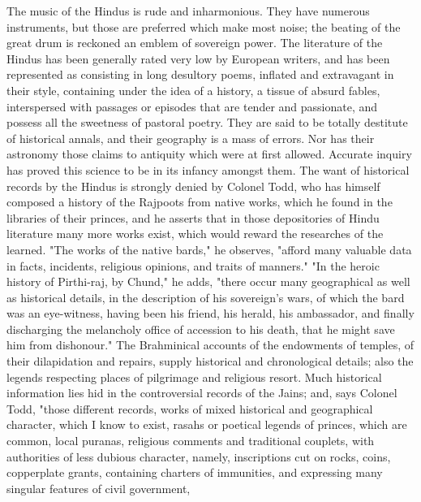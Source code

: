 \documentclass{article}
\begin{document}
The music of the Hindus is rude and inharmonious. They have numerous instruments, but those are preferred which make most noise; the beating of the great drum is reckoned an emblem of sovereign power. The literature of the Hindus has been generally rated very low by European writers, and has been represented as consisting in long desultory poems, inflated and extravagant in their style, containing under the idea of a history, a tissue of absurd fables, interspersed with passages or episodes that are tender and passionate, and possess all the sweetness of pastoral poetry. They are said to be totally destitute of historical annals, and their geography is a mass of errors. Nor has their astronomy those claims to antiquity which were at first allowed. Accurate inquiry has proved this science to be in its infancy amongst them. The want of historical records by the Hindus is strongly denied by Colonel Todd, who has himself composed a history of the Rajpoots from native works, which he found in the libraries of their princes, and he asserts that in those depositories of Hindu literature many more works exist, which would reward the researches of the learned. "The works of the native bards," he observes, "afford many valuable data in facts, incidents, religious opinions, and traits of manners." "In the heroic history of Pirthi-raj, by Chund," he adds, "there occur many geographical as well as historical details, in the description of his sovereign's wars, of which the bard was an eye-witness, having been his friend, his herald, his ambassador, and finally discharging the melancholy office of accession to his death, that he might save him from dishonour." The Brahminical accounts of the endowments of temples, of their dilapidation and repairs, supply historical and chronological details; also the legends respecting places of pilgrimage and religious resort. Much historical information lies hid in the controversial records of the Jains; and, says Colonel Todd, "those different records, works of mixed historical and geographical character, which I know to exist, rasahs or poetical legends of princes, which are common, local puranas, religious comments and traditional couplets, with authorities of less dubious character, namely, inscriptions cut on rocks, coins, copperplate grants, containing charters of immunities, and expressing many singular features of civil government,
\end{document}

